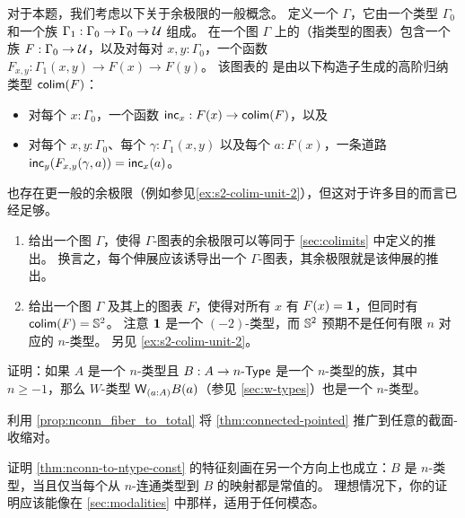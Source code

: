 \begin{ex}\label{ex:s2-colim-unit}
  对于本题，我们考虑以下关于余极限的一般概念。
  定义一个 $\Gamma$，它由一个类型 $\Gamma_0$ 和一个族 $\Gamma_1 : \Gamma_0 \to \Gamma_0 \to \mathcal{U}$ 组成。
  在一个图 $\Gamma$ 上的（指类型的图表）包含一个族 $F:\Gamma_0 \to \mathcal{U}$，以及对每对 $x,y:\Gamma_0$，一个函数 $F_{x,y}:\Gamma_1(x,y) \to F(x) \to F(y)$。
  该图表的 是由以下构造子生成的高阶归纳类型 $\mathsf{colim}(F)$：
  \begin{itemize}
  \item 对每个 $x:\Gamma_0$，一个函数 $\mathsf{inc}_x:F(x) \to \mathsf{colim}(F)$，以及
  \item 对每个 $x,y:\Gamma_0$、每个 $\gamma:\Gamma_1(x,y)$ 以及每个 $a:F(x)$，一条道路 $\mathsf{inc}_y(F_{x,y}(\gamma,a)) = \mathsf{inc}_x(a)$。
  \end{itemize}
  也存在更一般的余极限（例如参见\cref{ex:s2-colim-unit-2}），但这对于许多目的而言已经足够。
  \begin{enumerate}
  \item 给出一个图 $\Gamma$，使得 $\Gamma$-图表的余极限可以等同于 \cref{sec:colimits} 中定义的推出。
    换言之，每个伸展应该诱导出一个 $\Gamma$-图表，其余极限就是该伸展的推出。
  \item 给出一个图 $\Gamma$ 及其上的图表 $F$，使得对所有 $x$ 有 $F(x)=\mathbf{1}$，但同时有 $\mathsf{colim}(F)=\mathbb{S}^2$。
    注意 $\mathbf{1}$ 是一个 $(-2)$-类型，而 $\mathbb{S}^2$ 预期不是任何有限 $n$ 对应的 $n$-类型。
    另见 \cref{ex:s2-colim-unit-2}。
  \end{enumerate}
\end{ex}

\begin{ex}\label{ex:ntypes-closed-under-wtypes}
  证明：如果 $A$ 是一个 $n$-类型且 $B:A\to {n}\text-\mathsf{Type}$ 是一个 $n$-类型的族，其中 $n\ge -1$，那么 $W$-类型 $\wtype{a:A} B(a)$（参见 \cref{sec:w-types}）也是一个 $n$-类型。
\end{ex}

\begin{ex}\label{ex:connected-pointed-all-section-retraction}
  利用 \cref{prop:nconn_fiber_to_total} 将 \cref{thm:connected-pointed} 推广到任意的截面-收缩对。
\end{ex}

\begin{ex}\label{ex:ntype-from-nconn-const}
  证明 \cref{thm:nconn-to-ntype-const} 的特征刻画在另一个方向上也成立：$B$ 是 $n$-类型，当且仅当每个从 $n$-连通类型到 $B$ 的映射都是常值的。
  理想情况下，你的证明应该能像在 \cref{sec:modalities} 中那样，适用于任何模态。
\end{ex}


